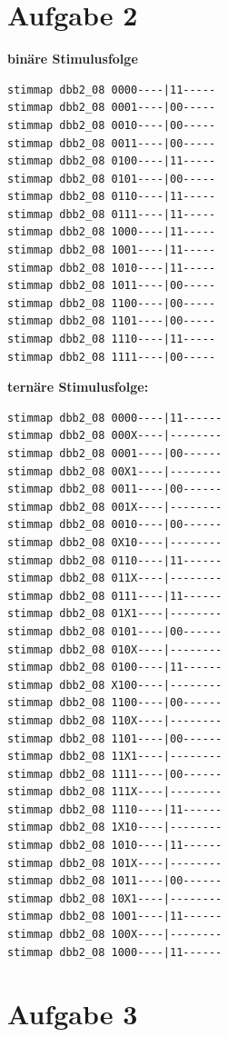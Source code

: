 \documentclass[fleqn]{article}
\begin{document}
\section{Aufgabe 2}

\textbf{binäre Stimulusfolge}
\begin{lstlisting}
stimmap dbb2_08 0000----|11-----
stimmap dbb2_08 0001----|00-----
stimmap dbb2_08 0010----|00-----
stimmap dbb2_08 0011----|00-----
stimmap dbb2_08 0100----|11-----
stimmap dbb2_08 0101----|00-----
stimmap dbb2_08 0110----|11-----
stimmap dbb2_08 0111----|11-----
stimmap dbb2_08 1000----|11-----
stimmap dbb2_08 1001----|11-----
stimmap dbb2_08 1010----|11-----
stimmap dbb2_08 1011----|00-----
stimmap dbb2_08 1100----|00-----
stimmap dbb2_08 1101----|00-----
stimmap dbb2_08 1110----|11-----
stimmap dbb2_08 1111----|00-----
\end{lstlisting}

\textbf{ternäre Stimulusfolge:} 
\begin{lstlisting}
stimmap dbb2_08 0000----|11------
stimmap dbb2_08 000X----|--------
stimmap dbb2_08 0001----|00------
stimmap dbb2_08 00X1----|--------
stimmap dbb2_08 0011----|00------
stimmap dbb2_08 001X----|--------
stimmap dbb2_08 0010----|00------
stimmap dbb2_08 0X10----|--------
stimmap dbb2_08 0110----|11------
stimmap dbb2_08 011X----|--------
stimmap dbb2_08 0111----|11------
stimmap dbb2_08 01X1----|--------
stimmap dbb2_08 0101----|00------
stimmap dbb2_08 010X----|--------
stimmap dbb2_08 0100----|11------
stimmap dbb2_08 X100----|--------
stimmap dbb2_08 1100----|00------
stimmap dbb2_08 110X----|--------
stimmap dbb2_08 1101----|00------
stimmap dbb2_08 11X1----|--------
stimmap dbb2_08 1111----|00------
stimmap dbb2_08 111X----|--------
stimmap dbb2_08 1110----|11------
stimmap dbb2_08 1X10----|--------
stimmap dbb2_08 1010----|11------
stimmap dbb2_08 101X----|--------
stimmap dbb2_08 1011----|00------
stimmap dbb2_08 10X1----|--------
stimmap dbb2_08 1001----|11------
stimmap dbb2_08 100X----|--------
stimmap dbb2_08 1000----|11------
\end{lstlisting}

\section{Aufgabe 3}
\end{document}
